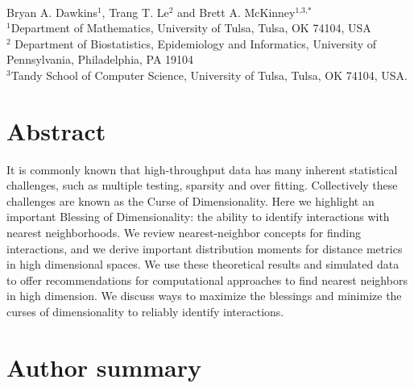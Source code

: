 \documentclass[10pt,letterpaper]{article}\usepackage[]{graphicx}\usepackage[]{color}
\begin{document}
\vspace*{0.2in}

{\Large
\textbf{} %
}
\newline
\\
Bryan A. Dawkins$^{\text{1}}$, Trang T. Le$^{\text{2}}$ and Brett A. McKinney$^{\text{1,3,}*}$
\\
$^{\text{1}}$Department of Mathematics, University of Tulsa, Tulsa, OK 74104, USA \\
$^{\text{2}}$ Department of Biostatistics, Epidemiology and Informatics,
University of Pennsylvania, Philadelphia, PA 19104\\
$^{\text{3}}$Tandy School of Computer Science, University of Tulsa, Tulsa, OK 74104, USA.



\section*{Abstract}
It is commonly known that high-throughput data has many inherent statistical challenges, such as multiple testing, sparsity and over fitting. Collectively these challenges are known as the Curse of Dimensionality. Here we highlight an important Blessing of Dimensionality: the ability to identify interactions with nearest neighborhoods. We review nearest-neighbor concepts for finding interactions, and we derive important distribution moments for distance metrics in high dimensional spaces. We use these theoretical results and simulated data to offer recommendations for computational approaches to find nearest neighbors in high dimension. We discuss ways to maximize the blessings and minimize the curses of dimensionality to reliably identify interactions.  

\section*{Author summary}
\end{document}
